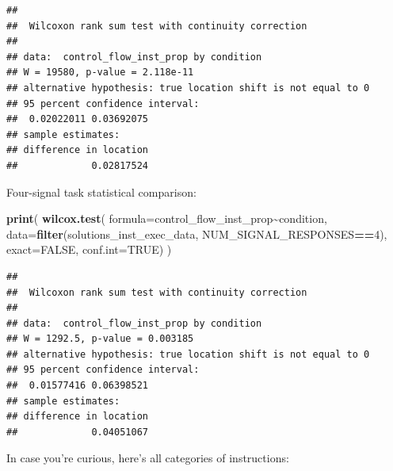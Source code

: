 \documentclass[
]{book}
\newenvironment{Shaded}{\begin{snugshade}}{\end{snugshade}}
\newcommand{\DataTypeTok}[1]{\textcolor[rgb]{0.13,0.29,0.53}{#1}}
\newcommand{\DecValTok}[1]{\textcolor[rgb]{0.00,0.00,0.81}{#1}}
\newcommand{\KeywordTok}[1]{\textcolor[rgb]{0.13,0.29,0.53}{\textbf{#1}}}
\newcommand{\NormalTok}[1]{#1}
\newcommand{\OperatorTok}[1]{\textcolor[rgb]{0.81,0.36,0.00}{\textbf{#1}}}
\newcommand{\OtherTok}[1]{\textcolor[rgb]{0.56,0.35,0.01}{#1}}
\begin{document}
\begin{verbatim}
## 
##  Wilcoxon rank sum test with continuity correction
## 
## data:  control_flow_inst_prop by condition
## W = 19580, p-value = 2.118e-11
## alternative hypothesis: true location shift is not equal to 0
## 95 percent confidence interval:
##  0.02022011 0.03692075
## sample estimates:
## difference in location 
##             0.02817524
\end{verbatim}

Four-signal task statistical comparison:

\begin{Shaded}
\begin{Highlighting}[]
\KeywordTok{print}\NormalTok{(}
  \KeywordTok{wilcox.test}\NormalTok{(}
    \DataTypeTok{formula=}\NormalTok{control\_flow\_inst\_prop}\OperatorTok{\textasciitilde{}}\NormalTok{condition,}
    \DataTypeTok{data=}\KeywordTok{filter}\NormalTok{(solutions\_inst\_exec\_data, NUM\_SIGNAL\_RESPONSES}\OperatorTok{==}\DecValTok{4}\NormalTok{),}
    \DataTypeTok{exact=}\OtherTok{FALSE}\NormalTok{,}
    \DataTypeTok{conf.int=}\OtherTok{TRUE}\NormalTok{)}
\NormalTok{)}
\end{Highlighting}
\end{Shaded}

\begin{verbatim}
## 
##  Wilcoxon rank sum test with continuity correction
## 
## data:  control_flow_inst_prop by condition
## W = 1292.5, p-value = 0.003185
## alternative hypothesis: true location shift is not equal to 0
## 95 percent confidence interval:
##  0.01577416 0.06398521
## sample estimates:
## difference in location 
##             0.04051067
\end{verbatim}

In case you're curious, here's all categories of instructions:
\end{document}
